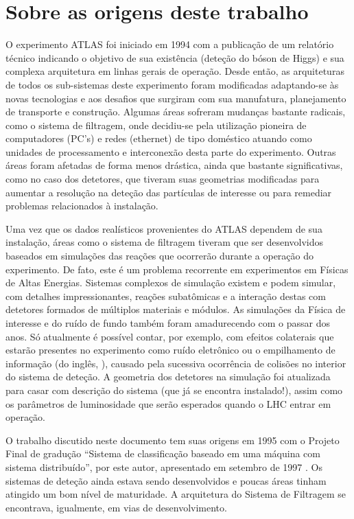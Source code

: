 \section{Sobre as origens deste trabalho}

O experimento ATLAS foi iniciado em 1994 com a publicação de um relatório
técnico indicando o objetivo de sua existência (deteção do bóson de Higgs) e
sua complexa arquitetura em linhas gerais de operação. Desde então, as
arquiteturas de todos os sub-sistemas deste experimento foram modificadas
adaptando-se às novas tecnologias e aos desafios que surgiram com sua
manufatura, planejamento de transporte e construção. Algumas áreas sofreram
mudanças bastante radicais, como o sistema de filtragem, onde decidiu-se pela
utilização pioneira de computadores (PC's) e redes (ethernet) de tipo
doméstico atuando como unidades de processamento e interconexão desta parte do
experimento. Outras áreas foram afetadas de forma menos drástica, ainda que
bastante significativas, como no caso dos detetores, que tiveram suas
geometrias modificadas para aumentar a resolução na deteção das partículas de
interesse ou para remediar problemas relacionados à instalação.

Uma vez que os dados realísticos provenientes do ATLAS dependem de sua
instalação, áreas como o sistema de filtragem tiveram que ser desenvolvidos
baseados em simulações das reações que ocorrerão durante a operação do
experimento. De fato, este é um problema recorrente em experimentos em Físicas
de Altas Energias. Sistemas complexos de simulação existem e podem simular,
com detalhes impressionantes, reações subatômicas e a interação destas com
detetores formados de múltiplos materiais e módulos. As simulações da Física
de interesse e do ruído de fundo também foram amadurecendo com o passar dos
anos. Só atualmente é possível contar, por exemplo, com efeitos colaterais que
estarão presentes no experimento como ruído eletrônico ou o empilhamento de
informação (do inglês, ), causado pela sucessiva ocorrência de
colisões no interior do sistema de deteção. A geometria dos detetores na
simulação foi atualizada para casar com descrição do sistema (que já se
encontra instalado!), assim como os parâmetros de luminosidade que serão
esperados quando o LHC entrar em operação.

O trabalho discutido neste documento tem suas origens em 1995 com o Projeto
Final de gradução ``Sistema de classificação baseado em uma máquina com
sistema distribuído'', por este autor, apresentado em setembro de 1997
\cite{aa:projeto-final}. Os sistemas de deteção ainda estava sendo
desenvolvidos e poucas áreas tinham atingido um bom nível de maturidade. A
arquitetura do Sistema de Filtragem se encontrava, igualmente, em vias de
desenvolvimento.

